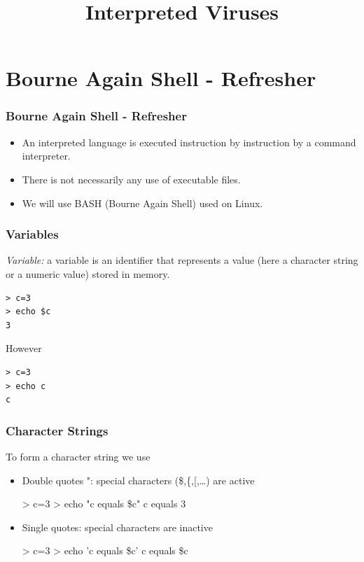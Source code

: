 \documentclass{beamer}
\title{Interpreted Viruses}
\newenvironment{terminal}{\color{white}\begin{snugshade*}}
{\end{snugshade*}\color{black}}
\newcommand{\enlight}[1]{\textit{\color{blue}#1}}
\begin{document}
\maketitle


\section{Bourne Again Shell - Refresher}

\begin{frame}
\frametitle{Bourne Again Shell - Refresher}


\begin{itemize}
\item An interpreted language is executed instruction by instruction by a command interpreter.
\item There is not necessarily any use of executable files.
\item We will use BASH (Bourne Again Shell) used on Linux.
\end{itemize}
\end{frame}



\begin{frame}[fragile]
\frametitle{Variables}
\enlight{Variable:} a variable is an identifier that represents a value (here a character string or a numeric value) stored in memory.
\begin{terminal}
\begin{verbatim}
> c=3
> echo $c
3
\end{verbatim}
\end{terminal}
However
\begin{terminal}
\begin{verbatim}
> c=3
> echo c
c
\end{verbatim}
\end{terminal}
\end{frame}

\begin{frame}[fragile]
\frametitle{Character Strings}

To form a character string we use
\begin{itemize}
\item Double quotes ": special characters (\$,\{,[,\ldots) are active
  \begin{terminal}
\begin{semiverbatim}
> c=3
> echo "c equals \$c"
c equals 3
\end{semiverbatim}
\end{terminal}
\item Single quotes: special characters are inactive
\begin{terminal}
\begin{semiverbatim}
> c=3
> echo 'c equals \$c'
c equals \$c
\end{semiverbatim}
\end{terminal}
\end{itemize}
\end{frame}
\end{document}
